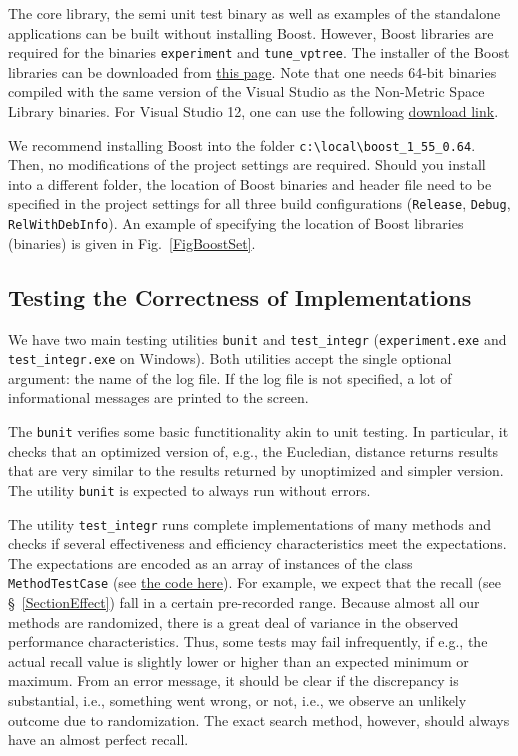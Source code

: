 \documentclass[runningheads,a4paper]{llncs}
\newcommand{\nonmetrlib}{Non-Metric Space Library}
\newcommand{\ttt}[1]{\texttt{#1}}
\begin{document}
{The core library, the semi unit test binary as well as examples of the standalone applications
can be built without installing Boost. 
However, Boost libraries are required for the binaries \ttt{experiment} and \ttt{tune\_vptree}.
The installer of the Boost libraries can be downloaded from \href{http://boost.teeks99.com/bin/1.55.0/}{this page}. 
Note that one needs 64-bit binaries compiled with the same version of the Visual Studio as the \nonmetrlib{} binaries.  For Visual Studio 12, one can use the following \href{http://boost.teeks99.com/bin/1.55.0/boost_1_55_0-msvc-12.0-64.exe}{download link}.

We recommend installing Boost into the folder \ttt{c:\textbackslash local\textbackslash boost\_1\_55\_0.64}. Then, no modifications of the project settings are required.
Should you install into a different folder, 
the location of Boost binaries and header file need to be specified in the 
project settings for all three build configurations (\ttt{Release}, \ttt{Debug}, \ttt{RelWithDebInfo}). An example of specifying the location of Boost libraries (binaries) is given in Fig.~\ref{FigBoostSet}.

\subsection{Testing the Correctness of Implementations}
We have two main testing utilities \ttt{bunit} and \ttt{test\_integr} (\ttt{experiment.exe} and
\ttt{test\_integr.exe} on Windows).
Both utilities accept the single optional argument: the name of the log file.
If the log file is not specified, a lot of informational messages are printed to the screen.

The \ttt{bunit} verifies some basic functitionality akin to unit testing.
In particular, it checks that an optimized version of, e.g., the Eucledian, distance
returns results that are very similar to the results returned by unoptimized and simpler version.
The utility \ttt{bunit} is expected to always run without errors.

The utility \ttt{test\_integr} runs complete implementations of many methods
and checks if several effectiveness and efficiency characteristics
meet the expectations.
The expectations are encoded as an array of instances of the class \ttt{MethodTestCase}
(see \href{https://github.com/searchivarius/NonMetricSpaceLib/blob/master/similarity_search/test/test_integr.cc#L65}{the code here}).
For example, we expect that the recall (see \S~\ref{SectionEffect})
fall in a certain pre-recorded range.
Because almost all our methods are randomized, there is a great deal of variance
in the observed performance characteristics. Thus, some tests
may fail infrequently, if e.g., the actual recall value is slightly lower or higher 
than an expected minimum  or maximum.
From an error message, it should be clear if the discrepancy is substantial, i.e.,
something went wrong, or not, i.e., we observe an unlikely outcome due to randomization.
The exact search method, however, should always have an almost perfect recall.

}
\end{document}
